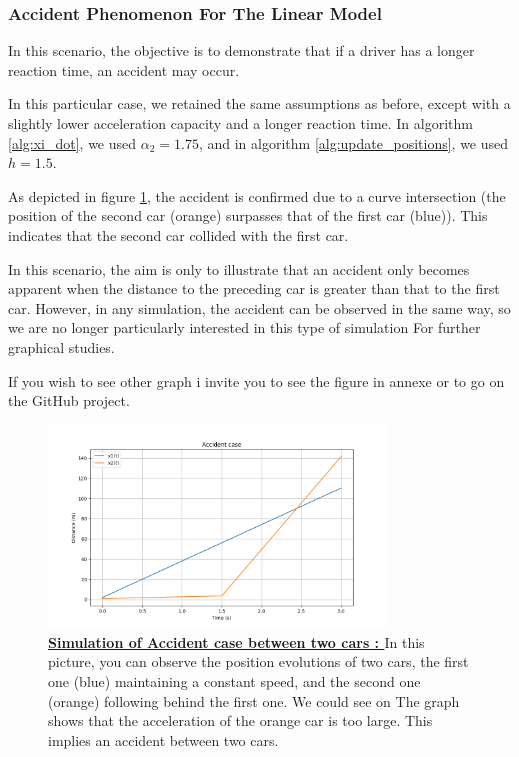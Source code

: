 \documentclass{article}
\begin{document}
		
		
		\subsubsection{Accident Phenomenon For The Linear Model }
		
		In this scenario, the objective is to demonstrate that if a driver has a longer reaction time, an accident may occur.
		
		In this particular case, we retained the same assumptions as before, except with a slightly lower acceleration capacity and a longer reaction time. In algorithm \ref{alg:xi_dot}, we used $\alpha_2=1.75$, and in algorithm \ref{alg:update_positions}, we used $h=1.5$.
		
		As depicted in figure \ref{fig:Acc1}, the accident is confirmed due to a curve intersection (the position of the second car (orange) surpasses that of the first car (blue)). This indicates that the second car collided with the first car.
		
		In this scenario, the aim is only to illustrate that an accident only becomes apparent when the distance to the preceding car is greater than that to the first car. However, in any simulation, the accident can be observed in the same way, so we are no longer particularly interested in this type of simulation For further graphical studies.
		
		If you wish to see other graph i invite you to see the figure in annexe or to go on the GitHub project.
	
		
		\begin{figure}[H]
			\centering
			\includegraphics[width=0.8\textwidth]{Acc1.png}
			\caption[Simulation of Accident case between two cars]{\textbf{\underline{Simulation of Accident case between two cars : }} In this picture, you can observe the position evolutions of two cars, the first one (blue) maintaining a constant speed, and the second one (orange) following behind the first one. We could see on The graph shows that the acceleration of the orange car is too large. This implies an accident between two cars.}
			\label{fig:Acc1}
		\end{figure}
		
\end{document}

